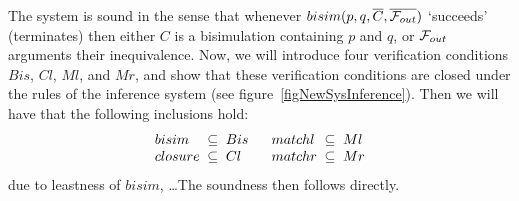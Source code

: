 The system is sound in the sense that whenever $bisim(p,q,\overline{C},\overline{{\cal F}_{out}})$ `succeeds' (terminates) then either $C$ is a bisimulation containing $p$ and $q$, or ${\cal F}_{out}$ arguments their inequivalence. Now, we will introduce four verification conditions $Bis$, $Cl$, $Ml$, and $Mr$, and show that these verification conditions are closed under the rules of the inference system (see figure~\ref{figNewSysInference}). Then we will have that the following inclusions hold:
\[
\begin{array}{l@{\;\;\subseteq\;\;}l@{\;\;\;\;\;\;}l@{\;\;\subseteq\;\;}l}
bisim &  Bis & matchl &  Ml\\
closure & Cl & matchr &  Mr\\
\end{array}
\]
due to leastness of $bisim$, \ldots The soundness then follows directly.
